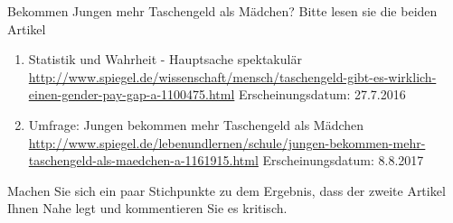 \documentclass[usenames,dvipsnames,handout]{beamer}
\begin{document}
\begin{frame}{Bekommen Jungen mehr Taschengeld als Mädchen?}
Bitte lesen sie die beiden Artikel 
\begin{enumerate}
\item{ \colorbox{yellow!20}{Statistik und Wahrheit - Hauptsache spektakulär} \footnotesize{ \url{http://www.spiegel.de/wissenschaft/mensch/taschengeld-gibt-es-wirklich-einen-gender-pay-gap-a-1100475.html} } 
Erscheinungsdatum: 27.7.2016}
\item{ \colorbox{yellow!20}{ Umfrage: Jungen bekommen mehr Taschengeld als Mädchen} \footnotesize{ \url{http://www.spiegel.de/lebenundlernen/schule/jungen-bekommen-mehr-taschengeld-als-maedchen-a-1161915.html} }
Erscheinungsdatum:  8.8.2017}
\end{enumerate}
\colorbox{green!20}{Machen Sie sich ein paar Stichpunkte zu dem Ergebnis, }
\colorbox{green!20}{dass der zweite Artikel Ihnen Nahe legt und kommentieren Sie es kritisch.}
\end{frame}
\end{document}
